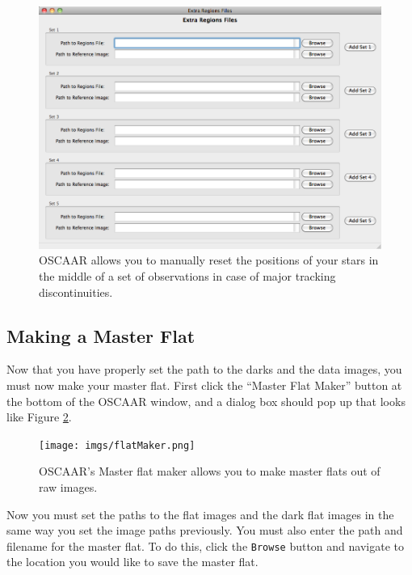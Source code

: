 \documentclass[a4paper]{article}
\newcommand{\code}[1]{\texttt{#1}}
\begin{document}
\begin{figure}[H]
\begin{center}
\includegraphics[scale=0.3]{imgs/extraRegions.png}
\caption{OSCAAR allows you to manually reset the positions of your stars in the middle of a set of observations in case of major tracking discontinuities.}
\label{fig:extraRegions}
\end{center}	
\end{figure}


\subsection{Making a Master Flat}
Now that you have properly set the path to the darks and the data images, you must now make your master flat. First click the ``Master Flat Maker'' button at the bottom of the OSCAAR window, and a dialog box should pop up that looks like Figure \ref{fig:flats}.
\begin{figure}[H]
\begin{center}
\texttt{[image: imgs/flatMaker.png]}
\caption{OSCAAR's Master flat maker allows you to make master flats out of raw images.}
\label{fig:flats}
\end{center}	
\end{figure}

Now you must set the paths to the flat images and the dark flat images in the same way you set the image paths previously. You must also enter the path and filename for the master flat. To do this, click the \code{Browse} button and navigate to the location you would like to save the master flat. 
\end{document}
